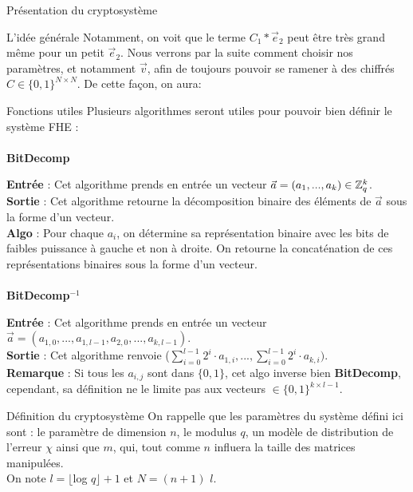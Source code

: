 \begin{section}{Présentation du cryptosystème}
\begin{subsection}{L'idée générale}
	Notamment, on voit que le terme $C_1 * \vec{e}_2$ peut être très grand 
	même pour un petit $\vec{e}_2$. Nous verrons par la suite comment
	choisir nos paramètres, et notamment $\vec{v}$, afin de 
	toujours pouvoir se ramener à des chiffrés $C \in \{0,1\}^{N
	\times N}$. De cette façon, on aura:

	
	
	




	\end{subsection}
	\begin{subsection}{Fonctions utiles}
	Plusieurs algorithmes seront utiles pour pouvoir bien définir le système FHE :
	
	\paragraph{}
	\textbf{BitDecomp}
	\flushleft

	\textbf{Entrée} : Cet algorithme prends en entrée un vecteur $\vec{a} = (a_1, ..., a_k) \in \mathbb{Z}_q^{k}$. \\
	\textbf{Sortie} : Cet algorithme retourne la décomposition binaire des éléments de $\vec{a}$ sous la forme d'un vecteur. \\
	\textbf{Algo} : Pour chaque $a_i$, on détermine sa représentation binaire avec les bits de faibles puissance à gauche et non à droite. On retourne la concaténation de ces représentations binaires sous la forme d'un vecteur.
	
	\paragraph{}
	\textbf{BitDecomp}$^{-1}$
	\flushleft

	\textbf{Entrée} : Cet algorithme prends en entrée un vecteur $\vec{a} = (a_{1,0}, ..., a_{1,l-1}, a_{2,0}, ..., a_{k,l-1})$. \\
	\textbf{Sortie} : Cet algorithme renvoie ($\sum\limits_{i=0}^{l-1} 2^{i} \cdot a_{1,i}, ..., \sum\limits_{i=0}^{l-1} 2^{i} \cdot a_{k,i})$. \\
	\textbf{Remarque} : Si tous les $a_{i,j}$ sont dans $\{ 0,1 \} $, cet algo inverse bien \textbf{BitDecomp}, cependant, sa définition ne le limite pas aux vecteurs $\in \{ 0,1\} ^{k\times l-1}$.
	
	\end{subsection}
	\begin{subsection}{Définition du cryptosystème}
	On rappelle que les paramètres du système défini ici sont : le paramètre de dimension $n$, le modulus $q$, un modèle de distribution de l'erreur $\chi$ ainsi que $m$, qui, tout comme $n$ influera la taille des matrices manipulées. \\
	On note $l = \lfloor$log $q\rfloor + 1$ et $N = (n + 1)$ $l$.
		

\end{subsection}
\end{section}
